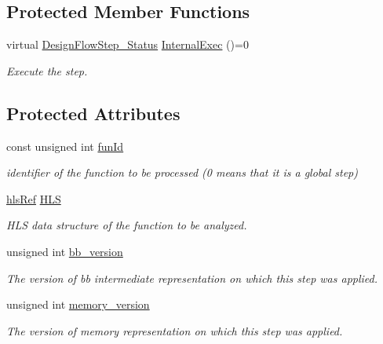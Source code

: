 \subsection*{Protected Member Functions}
\begin{DoxyCompactItemize}
\item 
virtual \hyperlink{design__flow__step_8hpp_afb1f0d73069c26076b8d31dbc8ebecdf}{Design\+Flow\+Step\+\_\+\+Status} \hyperlink{classHLSFunctionStep_a8db4c00d080655984d98143206fc9fa8}{Internal\+Exec} ()=0
\begin{DoxyCompactList}\small\item\em Execute the step. \end{DoxyCompactList}\end{DoxyCompactItemize}
\subsection*{Protected Attributes}
\begin{DoxyCompactItemize}
\item 
const unsigned int \hyperlink{classHLSFunctionStep_a3e6434fd86c698b0c70520b859bff5b0}{fun\+Id}
\begin{DoxyCompactList}\small\item\em identifier of the function to be processed (0 means that it is a global step) \end{DoxyCompactList}\item 
\hyperlink{hls_8hpp_a75d0c73923d0ddfa28c4843a802c73a7}{hls\+Ref} \hyperlink{classHLSFunctionStep_a1012ab6dc28ce9a560f0784455a89c56}{H\+LS}
\begin{DoxyCompactList}\small\item\em H\+LS data structure of the function to be analyzed. \end{DoxyCompactList}\item 
unsigned int \hyperlink{classHLSFunctionStep_a9cfc12812bd2a56cd16144a7dab31182}{bb\+\_\+version}
\begin{DoxyCompactList}\small\item\em The version of bb intermediate representation on which this step was applied. \end{DoxyCompactList}\item 
unsigned int \hyperlink{classHLSFunctionStep_a92a997a658503109e3b21c877aa376d8}{memory\+\_\+version}
\begin{DoxyCompactList}\small\item\em The version of memory representation on which this step was applied. \end{DoxyCompactList}\end{DoxyCompactItemize}
